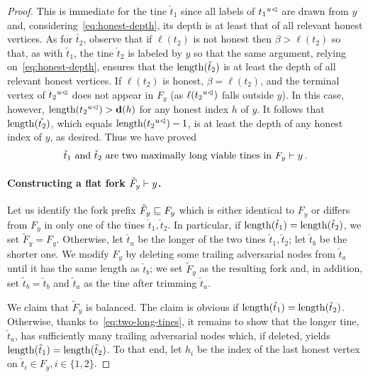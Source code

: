 \begin{proof}
    This is immediate for the tine
    $\check{t}_1$ since all labels of $\cut{u}{t_1}$ are drawn from
    $y$ and, considering~\eqref{eq:honest-depth}, its depth is
    at least that of all relevant honest vertices. 
    As for $\check{t_2}$,
    observe that if $\ell(t_2)$ is not honest then $\beta > \ell(t_2)$
    so that, as with $\check{t}_1$, the tine $\check{t}_2$ is labeled by
    $y$ so that the same argument, relying
    on~\eqref{eq:honest-depth}, ensures that the $\length(\check{t}_2)$ 
    is at least 
    the depth of all relevant honest vertices. 
    If $\ell(t_2)$ is
    honest, $\beta = \ell(t_2)$, and the terminal vertex of
    $\cut{u}{t_2}$ does not appear in $F_y$ (as $\ell(\cut{u}{t_2})$ falls outside 
    $y$). In this case, however,
    $\length(\cut{u}{t_2}) > \hdepth(h)$ for any honest index $h$ of
    $y$. 
    It follows that
    $\length(\check{t_2})$, which equals $\length(\cut{u}{t_2}) - 1$, 
    is at least the
    depth of any honest index of $y$, as desired. 
    Thus we have proved
    \begin{equation}\label{eq:two-long-tines}
        \text{$\check{t}_1$ and $\check{t}_2$ are 
        two maximally long viable tines in $F_y \Fork y$}
        \,.
    \end{equation}

    \paragraph{Constructing a flat fork $\tilde{F}_y \Fork y$.}    
    Let us identify the fork prefix $\tilde{F}_y \ForkPrefix F_y$ which 
    is either identical to $F_y$ or differs from $F_y$ 
    in only one of the tines $\check{t}_1, \check{t}_2$. 
    In particular, if $\length(\check{t}_1) = \length(\check{t}_2)$, we set $\tilde{F}_y = F_y$. 
    Otherwise, let $\check{t}_a$ be the longer of the two tines $\check{t}_1, \check{t}_2$; 
    let $\check{t}_b$ be the shorter one. 
    We modify $F_y$ by deleting some trailing adversarial nodes from $\check{t}_a$ 
    until it has the same length as $\check{t}_b$; 
    we set $\tilde{F}_y$ as the resulting fork 
    and, in addition, 
    set $\tilde{t}_b = \check{t}_b$ and 
    $\tilde{t}_a$ as the tine after trimming $\check{t}_a$. 
    
    We claim that $\tilde{F}_y$ is balanced. 
    The claim is obvious if $\length(\check{t}_1) = \length(\check{t}_2)$.
    Otherwise, thanks to~\eqref{eq:two-long-tines}, 
    it remains to show that the longer tine, $\check{t}_a$, 
    has sufficiently many trailing adversarial nodes which, 
    if deleted, yields $\length(\Final{t}_1) = \length(\Final{t}_2)$. 
    To that end, let $h_i$ be the index of the last honest vertex 
    on $\check{t}_i \in F_y, i \in \{1,2\}$. 
    

\end{proof}

